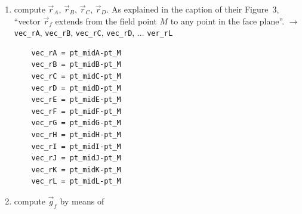 \begin{enumerate}
\begin{eqnarray}
\omega_K &=& 
2 \arctan \frac{\vec{r_{\color{teal}4}} \cdot (\vec{r}_{\color{teal}3} \times \vec{r}_{\color{teal}1})}
{{r}_{\color{teal}4}{r}_{\color{teal}3}{r}_{\color{teal}1} 
+{r}_{\color{teal}3}(\vec{r}_{\color{teal}1}\cdot\vec{r}_{\color{teal}4}) 
+{r}_{\color{teal}1}(\vec{r}_{\color{teal}4}\cdot\vec{r}_{\color{teal}3}) 
+{r}_{\color{teal}4}(\vec{r}_{\color{teal}3}\cdot\vec{r}_{\color{teal}1})  }  
\qquad K=\{{\color{teal}4,3,1}\}=\{ {\color{purple} 7,18,8} \}
\nn\\
\omega_L &=& 
2 \arctan \frac{\vec{r_{\color{teal}2}} \cdot (\vec{r}_{\color{teal}1} \times \vec{r}_{\color{teal}3})}
{{r}_{\color{teal}2}{r}_{\color{teal}1}{r}_{\color{teal}3} 
+{r}_{\color{teal}3}(\vec{r}_{\color{teal}2}\cdot\vec{r}_{\color{teal}1}) 
+{r}_{\color{teal}2}(\vec{r}_{\color{teal}1}\cdot\vec{r}_{\color{teal}3}) 
+{r}_{\color{teal}1}(\vec{r}_{\color{teal}3}\cdot\vec{r}_{\color{teal}2})  }  
\qquad L=\{ {\color{teal}2,1,3}\}=\{ {\color{purple} 5,18,6} \}
\nn
\end{eqnarray}



{\tiny
\begin{lstlisting}
num=np.dot(vec_r5,np.cross(vec_r1,vec_r6))
denom=(r05*r01*r06+r1*np.dot(vec_r06,vec_r05)+r2*np.dot(vec_r03,vec_r01)+r3*np.dot(vec_r01,vec_r02))
wA=2*np.arctan2(num,denom)
\end{lstlisting}
}




\item compute $\vec{r}_{A}$, $\vec{r}_{B}$, $\vec{r}_{C}$, $\vec{r}_{D}$.
As explained in the caption of their Figure~3, ``vector $\vec{r}_f$
extends from the field point $M$ to any point in the face plane''.
$\rightarrow$ \verb|vec_rA|, \verb|vec_rB|, \verb|vec_rC|, \verb|vec_rD|, ... \verb|ver_rL|

{\tiny
\begin{lstlisting}
    vec_rA = pt_midA-pt_M
    vec_rB = pt_midB-pt_M
    vec_rC = pt_midC-pt_M
    vec_rD = pt_midD-pt_M
    vec_rE = pt_midE-pt_M
    vec_rF = pt_midF-pt_M
    vec_rG = pt_midG-pt_M
    vec_rH = pt_midH-pt_M
    vec_rI = pt_midI-pt_M
    vec_rJ = pt_midJ-pt_M
    vec_rK = pt_midK-pt_M
    vec_rL = pt_midL-pt_M
\end{lstlisting}
}




\item compute $\vec{g}_f$ by means of %


\end{enumerate}
